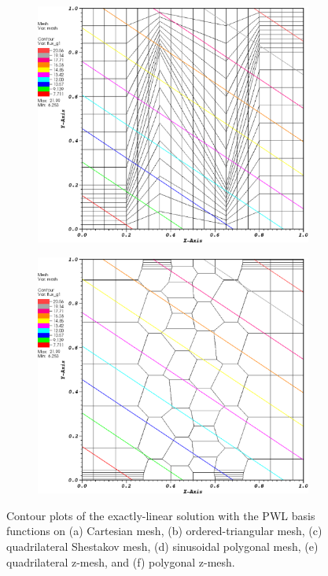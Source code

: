 \begin{figure}
\begin{subfigure}[b]{0.45\textwidth}
		\caption{}
	\end{subfigure}
	\vfill
	\begin{subfigure}[b]{0.45\textwidth}
		\centering
		\label{subfig::z_quad_pwld_lin_sol}
		\includegraphics[width=\textwidth]{figures/sec_BF/z_quad_PWLD_k1.eps}
		\caption{}
	\end{subfigure}
	\hfill
	\begin{subfigure}[b]{0.45\textwidth}
		\centering
		\label{subfig::z_poly_pwld_lin_sol}
		\includegraphics[width=\textwidth]{figures/sec_BF/z_poly_PWLD_k1.eps}
		\caption{}
	\end{subfigure}
\caption{Contour plots of the exactly-linear solution with the PWL basis functions on (a) Cartesian mesh, (b) ordered-triangular mesh, (c) quadrilateral Shestakov mesh, (d) sinusoidal polygonal mesh, (e) quadrilateral z-mesh, and (f) polygonal z-mesh.}
\label{fig::BF_Results_Linear_pwld_sol}
\end{figure}

